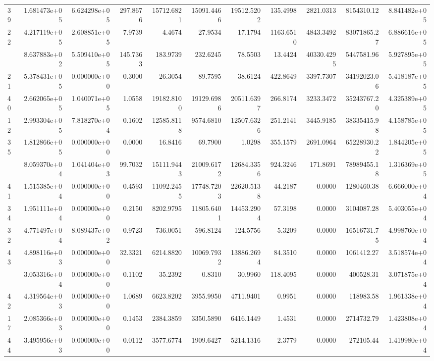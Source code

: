 \begin{table}
\begin{tabular}[t]{lrrrrrrrrrr}
39 & 1.681473e+05 & 6.624298e+05 & 297.8676 & 15712.6821 & 15091.4466 & 19512.5202 & 135.4998 & 2821.0313 & 8154310.12 & 8.841482e+05\\
22 & 4.217119e+05 & 2.608851e+05 & 7.9739 & 4.4674 & 27.9534 & 17.1794 & 1163.6510 & 4843.3492 & 83071865.27 & 6.886616e+05\\
\addlinespace
45 & 8.637883e+02 & 5.509410e+05 & 145.7363 & 183.9739 & 232.6245 & 78.5503 & 13.4424 & 40330.4295 & 5447581.96 & 5.927895e+05\\
21 & 5.378431e+05 & 0.000000e+00 & 0.3000 & 26.3054 & 89.7595 & 38.6124 & 422.8649 & 3397.7307 & 34192023.06 & 5.418187e+05\\
40 & 2.662065e+05 & 1.040071e+05 & 1.0558 & 19182.8100 & 19129.6986 & 20511.6397 & 266.8174 & 3233.3472 & 35243767.20 & 4.325389e+05\\
12 & 2.993304e+05 & 7.818270e+04 & 0.1602 & 12585.8118 & 9574.6810 & 12507.6326 & 251.2141 & 3445.9185 & 38335415.98 & 4.158785e+05\\
35 & 1.812866e+05 & 0.000000e+00 & 0.0000 & 16.8416 & 69.7900 & 1.0298 & 355.1579 & 2691.0964 & 65228930.22 & 1.844205e+05\\
\addlinespace
46 & 8.059370e+04 & 1.041404e+03 & 99.7032 & 15111.9443 & 21009.6172 & 12684.3356 & 924.3246 & 171.8691 & 78989455.18 & 1.316369e+05\\
41 & 1.515385e+04 & 0.000000e+00 & 0.4593 & 11092.2455 & 17748.7203 & 22620.5138 & 44.2187 & 0.0000 & 1280460.38 & 6.666000e+04\\
34 & 1.951111e+04 & 0.000000e+00 & 0.2150 & 8202.9795 & 11805.6401 & 14453.2904 & 57.3198 & 0.0000 & 3104087.28 & 5.403055e+04\\
32 & 4.771497e+04 & 8.089437e+02 & 0.9723 & 736.0051 & 596.8124 & 124.5756 & 5.3209 & 0.0000 & 16516731.75 & 4.998760e+04\\
43 & 4.898116e+03 & 0.000000e+00 & 32.3321 & 6214.8820 & 10069.7932 & 13886.2694 & 84.3510 & 0.0000 & 1061412.27 & 3.518574e+04\\
\addlinespace
16 & 3.053316e+04 & 0.000000e+00 & 0.1102 & 35.2392 & 0.8310 & 30.9960 & 118.4095 & 0.0000 & 400528.31 & 3.071875e+04\\
42 & 4.319564e+03 & 0.000000e+00 & 1.0689 & 6623.8202 & 3955.9950 & 4711.9401 & 0.9951 & 0.0000 & 118983.58 & 1.961338e+04\\
17 & 2.085366e+03 & 0.000000e+00 & 0.1453 & 2384.3859 & 3350.5890 & 6416.1449 & 1.4531 & 0.0000 & 2714732.79 & 1.423808e+04\\
44 & 3.495956e+03 & 0.000000e+00 & 0.0112 & 3577.6774 & 1909.6427 & 5214.1316 & 2.3779 & 0.0000 & 272105.44 & 1.419980e+04\\

\end{tabular}
\end{table}
